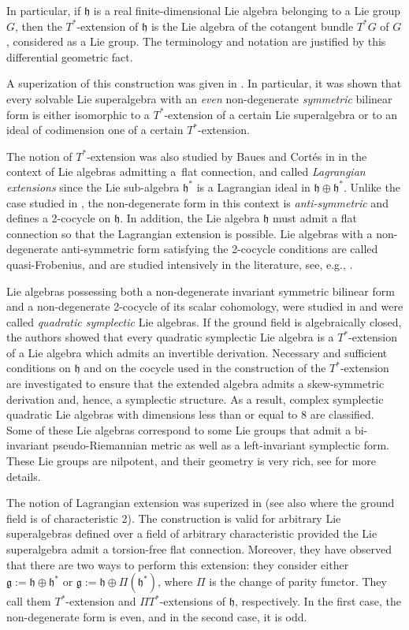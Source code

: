 \documentclass[12pt]{amsart}
\newcommand{\fg}{\mathfrak{g}}
\newcommand{\fh}{\mathfrak{h}}
\begin{document}
In particular,  if $\fh$ is a real finite-dimensional Lie algebra belonging to a Lie group $G$,  then the $T^*$-extension of $\fh$ is the Lie algebra of the cotangent bundle $T^*G$ of $G$,  considered as a Lie group.  The terminology and notation are justified by this differential geometric fact.

A superization of this construction was given in \cite{BBB}. In particular, it was shown that every solvable Lie superalgebra with an {\it even}  non-degenerate  \emph{symmetric} bilinear form is either isomorphic to a $T^*$-extension of a certain Lie superalgebra or to an ideal of codimension one of a certain $T^*$-extension.  

The notion of $T^*$-extension was also studied by Baues and Cort\'es in \cite{BC} in the context of Lie algebras admitting a~flat connection,  and called {\it Lagrangian extensions} since the Lie sub-algebra $\fh^*$ is a Lagrangian ideal in $\fh\oplus \fh^*$. Unlike the case studied in \cite{Bor}, the non-degenerate form in this context is \emph{anti-symmetric} and defines a 2-cocycle on $\fh$. In addition, the Lie algebra $\fh$ must admit a flat connection so that the Lagrangian extension is possible. Lie algebras with a non-degenerate anti-symmetric form satisfying the 2-cocycle conditions are called quasi-Frobenius, and are studied intensively in the literature, see, e.g., \cite{E, O}. 

Lie algebras possessing both a  non-degenerate invariant  symmetric bilinear form and a non-degenerate 2-cocycle of its scalar cohomology, were studied in \cite{BBM} and were called { \it quadratic symplectic} Lie algebras. If the ground field is algebraically closed, the authors showed that every quadratic symplectic Lie algebra is a $T^*$-extension of a Lie algebra which admits an invertible derivation. Necessary and sufficient conditions on $\fh$ and on the cocycle used in the construction of the $T^*$-extension are investigated to ensure that the extended algebra admits a 
skew-symmetric derivation and, hence, a symplectic structure. As a result, complex symplectic quadratic Lie algebras with dimensions less than or equal to 8 are classified. Some of these Lie algebras correspond to some Lie groups that admit a bi-invariant pseudo-Riemannian metric as well as a left-invariant symplectic form. These Lie groups are nilpotent, and their geometry is very rich, see \cite{BBM, MR} for more details. 


The notion of Lagrangian extension was superized  in \cite{BM} (see also \cite{BBE} where the ground field is of characteristic 2). The construction is valid for arbitrary Lie superalgebras defined over a field of arbitrary characteristic  provided the Lie superalgebra admit a torsion-free flat connection. Moreover, they have observed that there are two ways to perform this extension: they  consider either $\fg:=\fh\oplus \fh^*$ or $\fg:=\fh\oplus \Pi (\fh^*)$,  where $\Pi$ is the change of parity functor.  They call them $T^*$-extension and $\Pi T^*$-extensions of $\fh$,  respectively. In the first case, the non-degenerate form is even, and in the second case, it is odd.  
\end{document}

